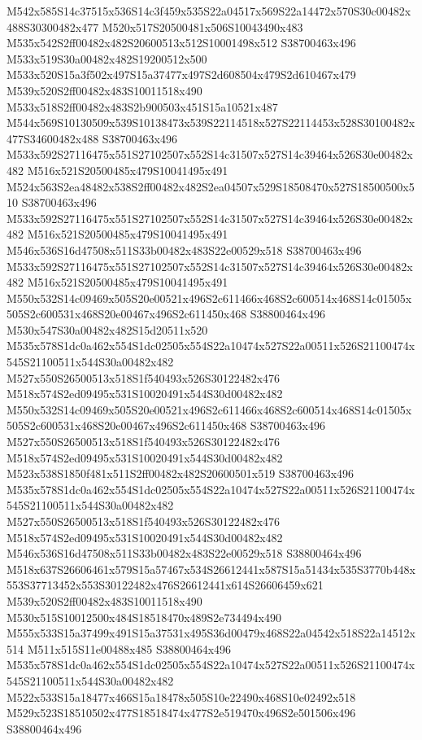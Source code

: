 \documentclass{article}
\begin{document}
\begin{multicols}{2}
M542x585S14c37515x536S14c3f459x535S22a04517x569S22a14472x570S30c00482x488S30300482x477 M520x517S20500481x506S10043490x483 M535x542S2ff00482x482S20600513x512S10001498x512 S38700463x496 M533x519S30a00482x482S19200512x500 M533x520S15a3f502x497S15a37477x497S2d608504x479S2d610467x479 M539x520S2ff00482x483S10011518x490 M533x518S2ff00482x483S2b900503x451S15a10521x487 M544x569S10130509x539S10138473x539S22114518x527S22114453x528S30100482x477S34600482x488 S38700463x496 M533x592S27116475x551S27102507x552S14c31507x527S14c39464x526S30e00482x482 M516x521S20500485x479S10041495x491 M524x563S2ea48482x538S2ff00482x482S2ea04507x529S18508470x527S18500500x510 S38700463x496 M533x592S27116475x551S27102507x552S14c31507x527S14c39464x526S30e00482x482 M516x521S20500485x479S10041495x491 M546x536S16d47508x511S33b00482x483S22e00529x518 S38700463x496 M533x592S27116475x551S27102507x552S14c31507x527S14c39464x526S30e00482x482 M516x521S20500485x479S10041495x491 M550x532S14c09469x505S20e00521x496S2c611466x468S2c600514x468S14c01505x505S2c600531x468S20e00467x496S2c611450x468 S38800464x496 M530x547S30a00482x482S15d20511x520 M535x578S1dc0a462x554S1dc02505x554S22a10474x527S22a00511x526S21100474x545S21100511x544S30a00482x482 M527x550S26500513x518S1f540493x526S30122482x476 M518x574S2ed09495x531S10020491x544S30d00482x482 M550x532S14c09469x505S20e00521x496S2c611466x468S2c600514x468S14c01505x505S2c600531x468S20e00467x496S2c611450x468 S38700463x496 M527x550S26500513x518S1f540493x526S30122482x476 M518x574S2ed09495x531S10020491x544S30d00482x482 M523x538S1850f481x511S2ff00482x482S20600501x519 S38700463x496 M535x578S1dc0a462x554S1dc02505x554S22a10474x527S22a00511x526S21100474x545S21100511x544S30a00482x482 M527x550S26500513x518S1f540493x526S30122482x476 M518x574S2ed09495x531S10020491x544S30d00482x482 M546x536S16d47508x511S33b00482x483S22e00529x518 S38800464x496 M518x637S26606461x579S15a57467x534S26612441x587S15a51434x535S3770b448x553S37713452x553S30122482x476S26612441x614S26606459x621 M539x520S2ff00482x483S10011518x490 M530x515S10012500x484S18518470x489S2e734494x490 M555x533S15a37499x491S15a37531x495S36d00479x468S22a04542x518S22a14512x514 M511x515S11e00488x485 S38800464x496 M535x578S1dc0a462x554S1dc02505x554S22a10474x527S22a00511x526S21100474x545S21100511x544S30a00482x482 M522x533S15a18477x466S15a18478x505S10e22490x468S10e02492x518 M529x523S18510502x477S18518474x477S2e519470x496S2e501506x496 S38800464x496


\end{multicols}
\end{document}
